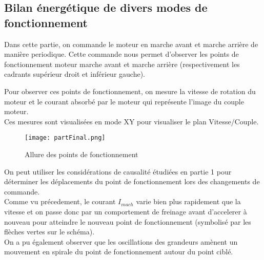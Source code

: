 \documentclass[oneside,a4paper,12pt]{article}
\begin{document}
	\newpage
	\subsection{Bilan énergétique de divers modes de fonctionnement}
		
	Dans cette partie, on commande le moteur en marche avant et marche arrière de manière periodique. Cette commande nous permet d'observer les points de fonctionnement moteur marche avant et marche arrière (respectivement les cadrants supérieur droit et inférieur gauche).
	
	Pour observer ces points de fonctionnement, on mesure la vitesse de rotation du moteur et le courant absorbé par le moteur qui représente l'image du couple moteur.\\
	Ces mesures sont visualisées en mode XY pour visualiser le plan Vitesse/Couple.\\
	
	\begin{figure}[h]
		\centering
		\texttt{[image: partFinal.png]}
		\caption{Allure des points de fonctionnement}
	\end{figure}

	On peut utiliser les considérations de causalité étudiées en partie 1 pour déterminer les déplacements du point de fonctionnement lors des changements de commande.\\
	Comme vu précedement, le courant $I_{mach}$ varie bien plus rapidement que la vitesse et on passe donc par un comportement de freinage avant d'accelerer à nouveau pour atteindre le nouveau point de fonctionnement (symbolisé par les flèches vertes sur le schéma).\\
	On a pu également observer que les oscillations des grandeurs amènent un mouvement en spirale du point de fonctionnement autour du point ciblé.\\
		
	
\end{document}
